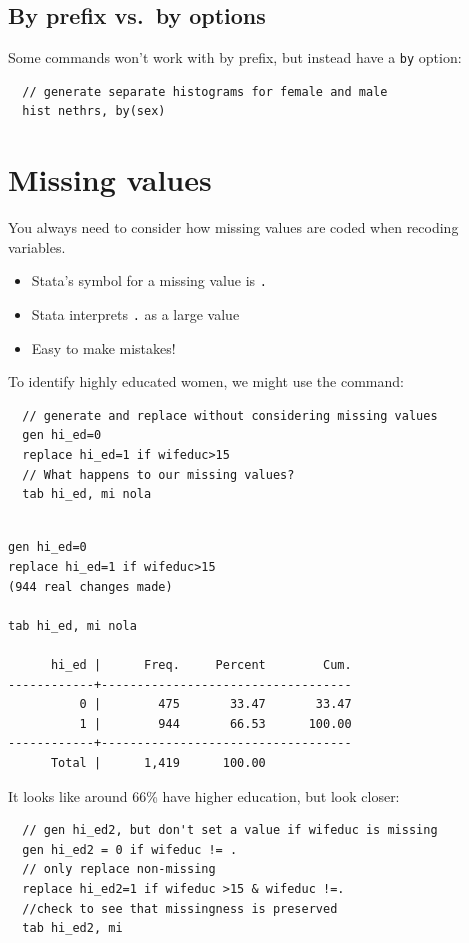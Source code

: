 \documentclass[]{book}
\providecommand{\tightlist}{%
  \setlength{\itemsep}{0pt}\setlength{\parskip}{0pt}}
\begin{document}
\subsection{By prefix vs.~by options}\label{by-prefix-vs.by-options}

Some commands won't work with by prefix, but instead have a \texttt{by}
option:

\begin{verbatim}
  // generate separate histograms for female and male 
  hist nethrs, by(sex)
\end{verbatim}

\section{Missing values}\label{missing-values}

You always need to consider how missing values are coded when recoding
variables.

\begin{itemize}
\tightlist
\item
  Stata's symbol for a missing value is \texttt{.}
\item
  Stata interprets \texttt{.} as a large value
\item
  Easy to make mistakes!
\end{itemize}

To identify highly educated women, we might use the command:

\begin{verbatim}
  // generate and replace without considering missing values
  gen hi_ed=0
  replace hi_ed=1 if wifeduc>15
  // What happens to our missing values?
  tab hi_ed, mi nola
\end{verbatim}

\begin{verbatim}

gen hi_ed=0
replace hi_ed=1 if wifeduc>15
(944 real changes made)

tab hi_ed, mi nola

      hi_ed |      Freq.     Percent        Cum.
------------+-----------------------------------
          0 |        475       33.47       33.47
          1 |        944       66.53      100.00
------------+-----------------------------------
      Total |      1,419      100.00
\end{verbatim}

It looks like around 66\% have higher education, but look closer:

\begin{verbatim}
  // gen hi_ed2, but don't set a value if wifeduc is missing
  gen hi_ed2 = 0 if wifeduc != . 
  // only replace non-missing
  replace hi_ed2=1 if wifeduc >15 & wifeduc !=. 
  //check to see that missingness is preserved
  tab hi_ed2, mi
\end{verbatim}
\end{document}

